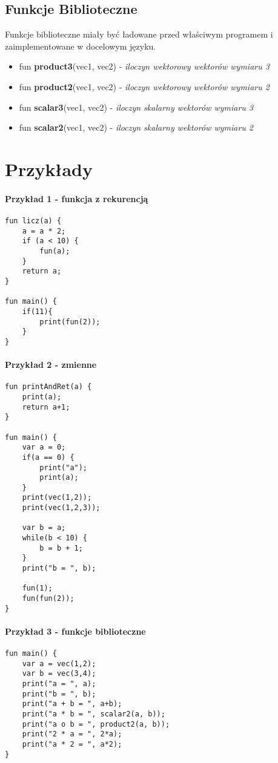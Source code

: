 \documentclass[11pt]{article} %
\begin{document}
\subsection{Funkcje Biblioteczne}
Funkcje biblioteczne miały być ładowane przed właściwym programem i zaimplementowane w docelowym języku. 
\begin{itemize}
	\item fun \textbf{product3}(vec1, vec2) - \textit{iloczyn wektorowy wektorów wymiaru 3}
	\item fun \textbf{product2}(vec1, vec2) - \textit{iloczyn wektorowy wektorów wymiaru 2}
	\item fun \textbf{scalar3}(vec1, vec2) - \textit{iloczyn skalarny wektorów wymiaru 3}
	\item fun \textbf{scalar2}(vec1, vec2) - \textit{iloczyn skalarny wektorów wymiaru 2}
\end{itemize}

\section{Przykłady}

\paragraph{Przykład 1 - funkcja z rekurencją}
\begin{verbatim}
fun licz(a) {
    a = a * 2;
    if (a < 10) {
        fun(a);
    }
    return a;
}  				

fun main() {
    if(11){
        print(fun(2));
    }
}					
\end{verbatim}

\paragraph{Przykład 2 - zmienne}
\begin{verbatim}
fun printAndRet(a) {
    print(a);
    return a+1;
}

fun main() {
    var a = 0;
    if(a == 0) {
        print("a");
        print(a);
    }
    print(vec(1,2));
    print(vec(1,2,3));

    var b = a;
    while(b < 10) {
        b = b + 1;
    }
    print("b = ", b);

    fun(1);
    fun(fun(2));
}   
\end{verbatim}

\paragraph{Przykład 3 - funkcje biblioteczne}
\begin{verbatim}
fun main() {
    var a = vec(1,2);
    var b = vec(3,4);
    print("a = ", a);
    print("b = ", b);
    print("a + b = ", a+b);
    print("a * b = ", scalar2(a, b));
    print("a o b = ", product2(a, b));
    print("2 * a = ", 2*a);
    print("a * 2 = ", a*2);
}
\end{verbatim}
\end{document}
